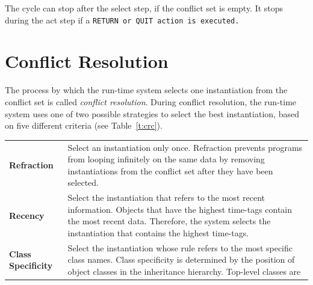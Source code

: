 The cycle can stop after the select step, if the conflict set is
empty. It stops during the act step if a \tt{RETURN} or \tt{QUIT}
action is executed.

\section{Conflict Resolution}
\label{s:conflict}

The process by which the run-time system selects one instantiation
from the conflict set is called \emph{conflict resolution}. During
conflict resolution, the run-time system uses one of two possible
strategies to select the best instantiation, based on five different
criteria (see Table~\ref{t:crc}).

\begin{table}[h]
  \def\arraystretch{1.2}
  \begin{tabularx}{\columnwidth}{lX}
    \toprule
    \textbf{Refraction}   & Select an instantiation 
                            only once.               
                            Refraction prevents       
                            programs from looping    
                            infinitely on the same   
                            data by removing         
                            instantiations from the 
                            conflict set after they 
                            have been selected.  \\
    \textbf{Recency}      & Select the instantiation 
                            that refers to the most  
                            recent information.      
                            Objects that have the    
                            highest time-tags contain
                            the most recent data.    
                            Therefore, the system    
                            selects the instantiation 
                            that contains the highest
                            time-tags.              \\
    \textbf{Class Specificity} & Select the instantiation 
                                 whose rule refers to the 
                                 most specific class      
                                 names.                   
                                 Class specificity is     
                                 determined by the        
                                 position of object       
                                 classes in the           
                                 inheritance hierarchy.  
                                 Top-level classes are    

\end{tabularx}
\end{table}
